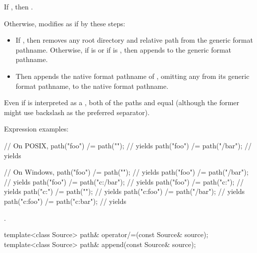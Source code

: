 \begin{itemdescr}
\pnum
\effects
If ,
then .

\pnum
Otherwise, modifies  as if by these steps:
\begin{itemize}
\item If ,
  then removes any root directory and relative path
  from the generic format pathname.
  Otherwise,
  if  is 
  or if  is ,
  then appends  to the generic format pathname.
\item Then appends the native format pathname of ,
  omitting any  from its generic format pathname,
  to the native format pathname.
\end{itemize}

\pnum
\begin{example}
Even if  is interpreted as a ,
both of the paths  and 
equal  (although the former might use backslash as the
preferred separator).

Expression examples:
\begin{codeblock}
// On POSIX,
path("foo") /= path("");        // yields 
path("foo") /= path("/bar");    // yields 

// On Windows,
path("foo") /= path("");        // yields 
path("foo") /= path("/bar");    // yields 
path("foo") /= path("c:/bar");  // yields 
path("foo") /= path("c:");      // yields 
path("c:") /= path("");         // yields 
path("c:foo") /= path("/bar");  // yields 
path("c:foo") /= path("c:bar"); // yields 
\end{codeblock}
\end{example}

\pnum
\returns
{}.
\end{itemdescr}

%
%
\begin{itemdecl}
template<class Source>
  path& operator/=(const Source& source);
template<class Source>
  path& append(const Source& source);
\end{itemdecl}

